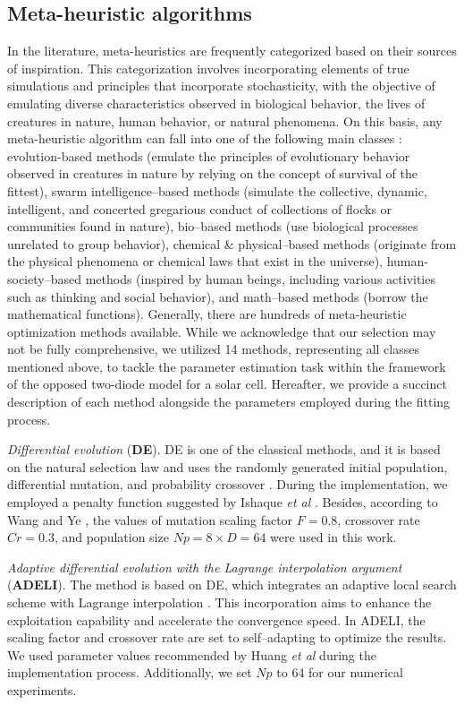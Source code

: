 \documentclass[a4paper,fleqn]{cas-sc}
\begin{document}
\subsection{Meta-heuristic algorithms}\label{MHA}
In the literature, meta-heuristics are frequently categorized based on their sources of inspiration.
This categorization involves incorporating elements of true simulations and principles that incorporate stochasticity,
with the objective of emulating diverse characteristics observed in biological behavior, the lives of creatures in nature, human behavior, or natural phenomena.
On this basis, any meta-heuristic algorithm can fall into one of the following main classes \cite{WhiteShark,Gannet,Dandelion}:
evolution-based methods (emulate the principles of evolutionary behavior observed in creatures in nature by relying on the concept of survival of the fittest),
swarm intelligence--based methods (simulate the collective, dynamic, intelligent, and concerted gregarious conduct of collections of flocks or communities found in nature),
bio--based methods (use biological processes unrelated to group behavior),
chemical \& physical--based methods (originate from the physical phenomena or chemical laws that exist in the universe),
human-society--based methods (inspired by human beings, including various activities such as thinking and social behavior),
and math--based methods (borrow the mathematical functions).
Generally, there are hundreds of meta-heuristic optimization methods available.
While we acknowledge that our selection may not be fully comprehensive,
we utilized 14 methods, representing all classes mentioned above,
to tackle the parameter estimation task within the framework of the opposed two-diode model for a solar cell.
Hereafter, we provide a succinct description of each method alongside the parameters employed during the fitting process.

\emph{Differential evolution} (\textbf{DE}).
DE is one of the classical methods,
and  it is based on the natural selection law and uses the randomly generated initial population,
differential mutation, and probability crossover \cite{DEWang}.
During the implementation, we employed a penalty function suggested by Ishaque \emph{et al} \cite{P-DE_Ishaque}.
Besides, according to Wang and Ye \cite{DEWang}, the values of mutation scaling factor $F=0.8$,
crossover rate $C\!r=0.3$, and population size $N\!p=8\times D=64$ were used in this work.

\emph{Adaptive differential evolution with the Lagrange interpolation argument} (\textbf{ADELI}).
The method is based on DE, which integrates an adaptive local search scheme with Lagrange interpolation \cite{ADELI}.
This incorporation aims to enhance the exploitation capability and accelerate the convergence speed.
In ADELI, the scaling factor and crossover rate are set to self--adapting to optimize the results.
We used parameter values recommended by Huang \emph{et al} \cite{ADELI} during the implementation process.
Additionally, we set $N\!p$ to 64 for our numerical experiments.
\end{document}
